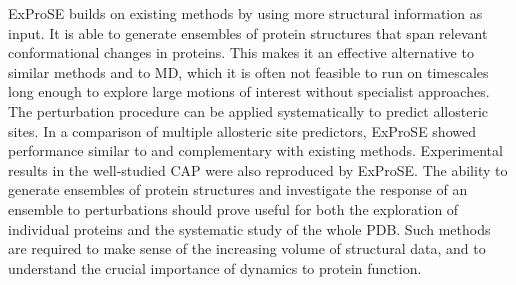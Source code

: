 ExProSE builds on existing methods by using more structural information as input.
It is able to generate ensembles of protein structures that span relevant conformational changes in proteins.
This makes it an effective alternative to similar methods and to MD, which it is often not feasible to run on timescales long enough to explore large motions of interest without specialist approaches.
The perturbation procedure can be applied systematically to predict allosteric sites.
In a comparison of multiple allosteric site predictors, ExProSE showed performance similar to and complementary with existing methods.
Experimental results in the well-studied CAP were also reproduced by ExProSE.
The ability to generate ensembles of protein structures and investigate the response of an ensemble to perturbations should prove useful for both the exploration of individual proteins and the systematic study of the whole PDB.
Such methods are required to make sense of the increasing volume of structural data, and to understand the crucial importance of dynamics to protein function.

